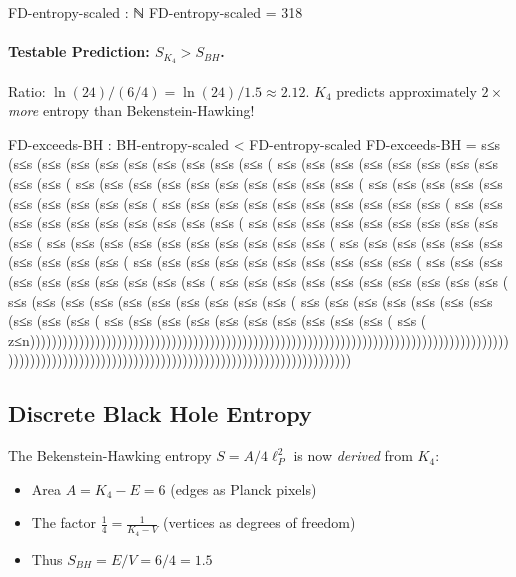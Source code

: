 \documentclass[11pt,a4paper]{book}
\def\text#1{#1}%
\begin{document}
\begin{code}
  FD-entropy-scaled : ℕ
  FD-entropy-scaled = 318

\end{code}

\paragraph{Testable Prediction: $S_{K_4} > S_{BH}$.}
Ratio: $\ln(24) / (6/4) = \ln(24) / 1.5 \approx 2.12$.
$K_4$ predicts approximately $2\times$ \emph{more} entropy than Bekenstein-Hawking!

\begin{code}
  FD-exceeds-BH : BH-entropy-scaled < FD-entropy-scaled
  FD-exceeds-BH = s≤s (s≤s (s≤s (s≤s (s≤s (s≤s (s≤s (s≤s (s≤s (s≤s (
                  s≤s (s≤s (s≤s (s≤s (s≤s (s≤s (s≤s (s≤s (s≤s (s≤s (
                  s≤s (s≤s (s≤s (s≤s (s≤s (s≤s (s≤s (s≤s (s≤s (s≤s (
                  s≤s (s≤s (s≤s (s≤s (s≤s (s≤s (s≤s (s≤s (s≤s (s≤s (
                  s≤s (s≤s (s≤s (s≤s (s≤s (s≤s (s≤s (s≤s (s≤s (s≤s (
                  s≤s (s≤s (s≤s (s≤s (s≤s (s≤s (s≤s (s≤s (s≤s (s≤s (
                  s≤s (s≤s (s≤s (s≤s (s≤s (s≤s (s≤s (s≤s (s≤s (s≤s (
                  s≤s (s≤s (s≤s (s≤s (s≤s (s≤s (s≤s (s≤s (s≤s (s≤s (
                  s≤s (s≤s (s≤s (s≤s (s≤s (s≤s (s≤s (s≤s (s≤s (s≤s (
                  s≤s (s≤s (s≤s (s≤s (s≤s (s≤s (s≤s (s≤s (s≤s (s≤s (
                  s≤s (s≤s (s≤s (s≤s (s≤s (s≤s (s≤s (s≤s (s≤s (s≤s (
                  s≤s (s≤s (s≤s (s≤s (s≤s (s≤s (s≤s (s≤s (s≤s (s≤s (
                  s≤s (s≤s (s≤s (s≤s (s≤s (s≤s (s≤s (s≤s (s≤s (s≤s (
                  s≤s (s≤s (s≤s (s≤s (s≤s (s≤s (s≤s (s≤s (s≤s (s≤s (
                  s≤s (s≤s (s≤s (s≤s (s≤s (s≤s (s≤s (s≤s (s≤s (s≤s (
                  s≤s (
                  z≤n)))))))))))))))))))))))))))))))))))))))))))))))))))))))))))))))))))))))))))))))))))))))))))))))))))))))))))))))))))))))))))))))))))))))))))))))))))))))
\end{code}

\subsection{Discrete Black Hole Entropy}

The Bekenstein-Hawking entropy $S = A/4\ell_P^2$ is now \emph{derived} from $K_4$:
\begin{itemize}
  \item Area $A = K_4\text{-}E = 6$ (edges as Planck pixels)
  \item The factor $\frac{1}{4} = \frac{1}{K_4\text{-}V}$ (vertices as degrees of freedom)
  \item Thus $S_{BH} = E/V = 6/4 = 1.5$
\end{itemize}
\end{document}
